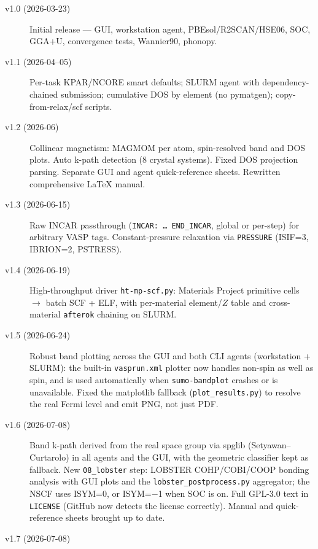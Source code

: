\documentclass[11pt,a4paper]{scrartcl}
\begin{document}
\begin{description}
  \item[\textcolor{mainblue}{v1.0} (2026-03-23)]
    Initial release --- GUI, workstation agent, PBEsol/R2SCAN/HSE06,
    SOC, GGA+U, convergence tests, Wannier90, phonopy.
  \item[\textcolor{mainblue}{v1.1} (2026-04--05)]
    Per-task KPAR/NCORE smart defaults; SLURM agent with dependency-chained
    submission; cumulative DOS by element (no pymatgen); copy-from-relax/scf
    scripts.
  \item[\textcolor{mainblue}{v1.2} (2026-06)]
    Collinear magnetism: MAGMOM per atom, spin-resolved band and DOS plots.
    Auto k-path detection (8 crystal systems).
    Fixed DOS projection parsing.
    Separate GUI and agent quick-reference sheets.
    Rewritten comprehensive LaTeX manual.
  \item[\textcolor{mainblue}{v1.3} (2026-06-15)]
    Raw INCAR passthrough (\texttt{INCAR: \ldots\ END\_INCAR}, global or
    per-step) for arbitrary VASP tags.
    Constant-pressure relaxation via \texttt{PRESSURE} (ISIF=3, IBRION=2,
    PSTRESS).
  \item[\textcolor{mainblue}{v1.4} (2026-06-19)]
    High-throughput driver \texttt{ht-mp-scf.py}: Materials Project primitive
    cells $\to$ batch SCF + ELF, with per-material element/$Z$ table and
    cross-material \texttt{afterok} chaining on SLURM.
  \item[\textcolor{mainblue}{v1.5} (2026-06-24)]
    Robust band plotting across the GUI and both CLI agents (workstation +
    SLURM): the built-in \texttt{vasprun.xml} plotter now handles non-spin as
    well as spin, and is used automatically when \texttt{sumo-bandplot} crashes
    or is unavailable.  Fixed the matplotlib fallback (\texttt{plot\_results.py})
    to resolve the real Fermi level and emit PNG, not just PDF.
  \item[\textcolor{mainblue}{v1.6} (2026-07-08)]
    Band k-path derived from the real space group via spglib
    (Setyawan--Curtarolo) in all agents and the GUI, with the geometric
    classifier kept as fallback.
    New \texttt{08\_lobster} step: LOBSTER COHP/COBI/COOP bonding
    analysis with GUI plots and the \texttt{lobster\_postprocess.py}
    aggregator; the NSCF uses ISYM=0, or ISYM=$-$1 when SOC is on.
    Full GPL-3.0 text in \texttt{LICENSE} (GitHub now detects the
    license correctly).
    Manual and quick-reference sheets brought up to date.
  \item[\textcolor{mainblue}{v1.7} (2026-07-08)]

\end{description}
\end{document}
